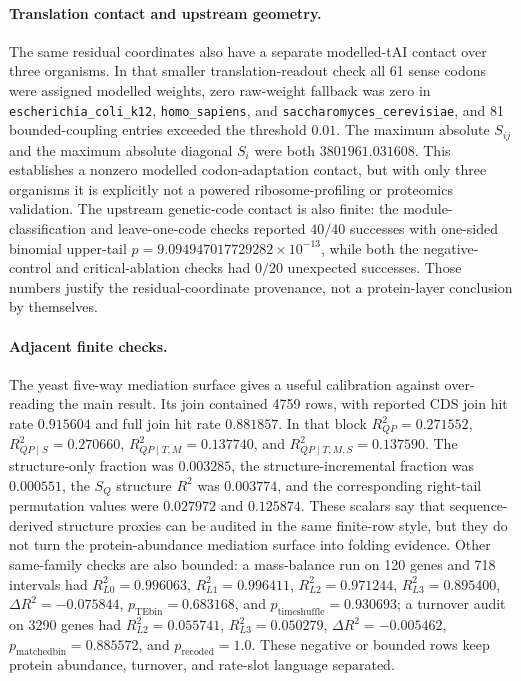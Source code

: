 \paragraph{Translation contact and upstream geometry.}
The same residual coordinates also have a separate modelled-tAI contact over three organisms.  In that smaller translation-readout check all 61 sense codons were assigned modelled weights, zero raw-weight fallback was zero in \texttt{escherichia\_coli\_k12}, \texttt{homo\_sapiens}, and \texttt{saccharomyces\_cerevisiae}, and 81 bounded-coupling entries exceeded the threshold $0.01$.  The maximum absolute $S_{ij}$ and the maximum absolute diagonal $S_i$ were both $3801961.031608$.  This establishes a nonzero modelled codon-adaptation contact, but with only three organisms it is explicitly not a powered ribosome-profiling or proteomics validation.  The upstream genetic-code contact is also finite: the module-classification and leave-one-code checks reported $40/40$ successes with one-sided binomial upper-tail $p=9.094947017729282\times 10^{-13}$, while both the negative-control and critical-ablation checks had $0/20$ unexpected successes.  Those numbers justify the residual-coordinate provenance, not a protein-layer conclusion by themselves.

\paragraph{Adjacent finite checks.}
The yeast five-way mediation surface gives a useful calibration against over-reading the main result.  Its join contained 4759 rows, with reported CDS join hit rate $0.915604$ and full join hit rate $0.881857$.  In that block $R^2_{QP}=0.271552$, $R^2_{QP\mid S}=0.270660$, $R^2_{QP\mid T,M}=0.137740$, and $R^2_{QP\mid T,M,S}=0.137590$.  The structure-only fraction was $0.003285$, the structure-incremental fraction was $0.000551$, the $S_Q$ structure $R^2$ was $0.003774$, and the corresponding right-tail permutation values were $0.027972$ and $0.125874$.  These scalars say that sequence-derived structure proxies can be audited in the same finite-row style, but they do not turn the protein-abundance mediation surface into folding evidence.  Other same-family checks are also bounded: a mass-balance run on 120 genes and 718 intervals had $R^2_{L0}=0.996063$, $R^2_{L1}=0.996411$, $R^2_{L2}=0.971244$, $R^2_{L3}=0.895400$, $\Delta R^2=-0.075844$, $p_{\mathrm{TEbin}}=0.683168$, and $p_{\mathrm{timeshuffle}}=0.930693$; a turnover audit on 3290 genes had $R^2_{L2}=0.055741$, $R^2_{L3}=0.050279$, $\Delta R^2=-0.005462$, $p_{\mathrm{matchedbin}}=0.885572$, and $p_{\mathrm{recoded}}=1.0$.  These negative or bounded rows keep protein abundance, turnover, and rate-slot language separated.

